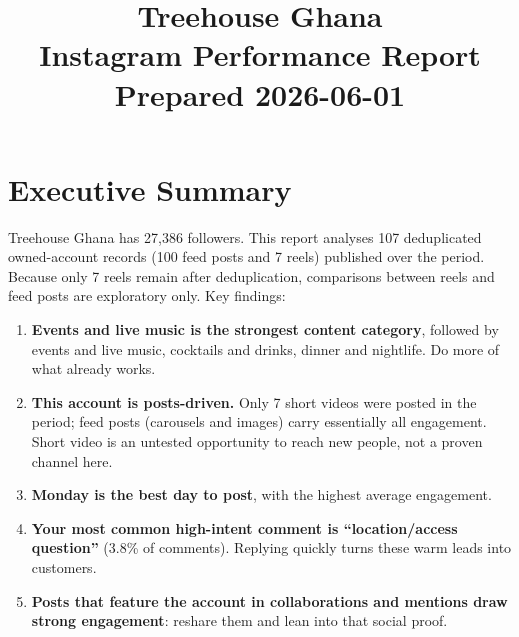 \documentclass[11pt,a4paper]{article}
\title{%
  \vspace{-1.5cm}
  {\color{tregreen}\Huge\bfseries Treehouse Ghana}\\[6pt]
  {\color{tregold}\large Instagram Performance Report}\\[4pt]
  {\normalsize Prepared 2026-06-01}
}
\author{}
\date{}
\begin{document}
\maketitle
\thispagestyle{fancy}

\noindent
{}
\vspace{8pt}

\section*{\color{tregreen}Executive Summary}

Treehouse Ghana has 27,386 followers.
This report analyses 107 deduplicated owned-account records (100 feed posts and 7 reels) published over the period. Because only 7 reels remain after deduplication, comparisons between reels and feed posts are exploratory only.
Key findings:

\begin{enumerate}
  \item \textbf{Events and live music is the strongest content category}, followed by events and live music, cocktails and drinks, dinner and nightlife. Do more of what already works.
  \item \textbf{This account is posts-driven.} Only 7 short videos were posted in the period; feed posts (carousels and images) carry essentially all engagement. Short video is an untested opportunity to reach new people, not a proven channel here.
  \item \textbf{Monday is the best day to post}, with the highest average engagement.
  \item \textbf{Your most common high-intent comment is \textquotedblleft{}location/access question\textquotedblright{}} (3.8\% of comments). Replying quickly turns these warm leads into customers.
  \item \textbf{Posts that feature the account in collaborations and mentions draw strong engagement}: reshare them and lean into that social proof.
\end{enumerate}
\end{document}
